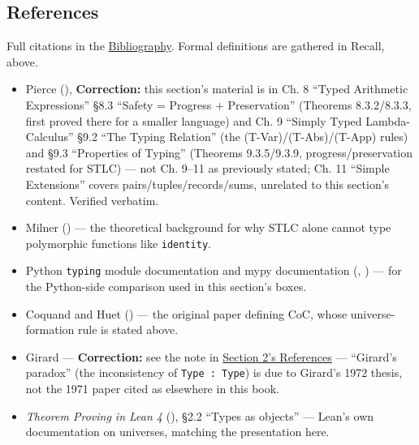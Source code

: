 \subsection{References}\label{sec:05-rigor-check:03-typing-rules-and-safety:8}

Full citations in the \hyperref[sec:root:bibliography:1]{Bibliography}. Formal definitions are gathered in Recall, above.

\begin{itemize}
\tightlist
\item
  Pierce (\cite{Pierce2002}), \textbf{Correction:} this section's material is in Ch. 8 ``Typed Arithmetic Expressions'' §8.3 ``Safety = Progress + Preservation'' (Theorems 8.3.2/8.3.3, first proved there for a smaller language) and Ch. 9 ``Simply Typed Lambda-Calculus'' §9.2 ``The Typing Relation'' (the (T-Var)/(T-Abs)/(T-App) rules) and §9.3 ``Properties of Typing'' (Theorems 9.3.5/9.3.9, progress/preservation restated for STLC) --- not Ch. 9--11 as previously stated; Ch. 11 ``Simple Extensions'' covers pairs/tuples/records/sums, unrelated to this section's content. Verified verbatim.
\item
  Milner (\cite{Milner1978}) --- the theoretical background for why STLC alone cannot type polymorphic functions like \texttt{identity}.
\item
  Python \texttt{typing} module documentation and mypy documentation (\cite{PythonTyping}, \cite{MypyDocs}) --- for the Python-side comparison used in this section's boxes.
\item
  Coquand and Huet (\cite{CoquandHuet1988}) --- the original paper defining CoC, whose universe-formation rule is stated above.
\item
  Girard --- \textbf{Correction:} see the note in \hyperref[sec:05-rigor-check:02-universes:1]{Section 2's References} --- ``Girard's paradox'' (the inconsistency of \texttt{Type : Type}) is due to Girard's 1972 thesis, not the 1971 paper cited as \cite{Girard1971} elsewhere in this book.
\item
  \emph{Theorem Proving in Lean 4} (\cite{TPIL4}), §2.2 ``Types as objects'' --- Lean's own documentation on universes, matching the presentation here.
\end{itemize}
